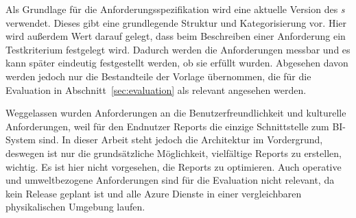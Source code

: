 Als Grundlage für die Anforderungsspezifikation wird eine aktuelle Version des \textit{s} \cite{robertson_volere_2020} verwendet. Dieses gibt eine grundlegende Struktur und Kategorisierung vor. Hier wird außerdem Wert darauf gelegt, dass beim Beschreiben einer Anforderung ein Testkriterium festgelegt wird. Dadurch werden die Anforderungen messbar und es kann später eindeutig festgestellt werden, ob sie erfüllt wurden. Abgesehen davon werden jedoch nur die Bestandteile der Vorlage übernommen, die für die Evaluation in Abschnitt~\ref{sec:evaluation} als relevant angesehen werden.

Weggelassen wurden Anforderungen an die Benutzerfreundlichkeit und kulturelle Anforderungen, weil für den Endnutzer Reports die einzige Schnittstelle zum BI-System sind. In dieser Arbeit steht jedoch die Architektur im Vordergrund, deswegen ist nur die grundsätzliche Möglichkeit, vielfältige Reports zu erstellen, wichtig. Es ist hier nicht vorgesehen, die Reports zu optimieren. Auch operative und umweltbezogene Anforderungen sind für die Evaluation nicht relevant, da kein Release geplant ist und alle Azure Dienste in einer vergleichbaren physikalischen Umgebung laufen.